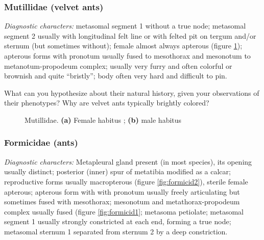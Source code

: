 \subsubsection{Mutillidae (velvet ants)}
\noindent{}\textit{Diagnostic characters:} metasomal segment 1 without a true node; metasomal segment 2 usually with longitudinal felt line or with felted pit on tergum and/or sternum (but sometimes without); female almost always apterous (figure \ref{fig:mutillid1}); apterous forms with pronotum usually fused to mesothorax and mesonotum to metanotum-propodeum complex; usually very furry and often colorful or brownish and quite ``bristly''; body often very hard and difficult to pin.\vspace{3mm}

\begin{theo}
{}What can you hypothesize about their natural history, given your observations of their phenotypes? Why are velvet ants typically brightly colored?
\end{theo}

\begin{figure}[ht!]
    \centering
    \begin{subfigure}[ht!]{0.45\textwidth}
        \caption{}
        \label{fig:mutillid1}
    \end{subfigure}
    \qquad
    \begin{subfigure}[ht!]{0.42\textwidth}
        \caption{}
        \label{fig:mutillid2}
    \end{subfigure}
    \caption{Mutillidae. \textbf{(a)} Female habitus \citep[][Fig. 63]{goulet1993hymenoptera}; \textbf{(b)} male habitus \citep[][Fig. 64]{goulet1993hymenoptera}}\label{fig:mutillids}
\end{figure}

\subsubsection{Formicidae (ants)}
\noindent{}\textit{Diagnostic characters:} Metapleural gland present (in most species), its opening usually distinct; posterior (inner) spur of metatibia modified as a calcar; reproductive forms usually macropterous (figure \ref{fig:formicid2}), sterile female apterous; apterous form with with pronotum usually freely articulating but sometimes fused with mesothorax; mesonotum and metathorax-propodeum complex usually fused (figure \ref{fig:formicid1}; metasoma petiolate; metasomal segment 1 usually strongly constricted at each end, forming a true node; metasomal sternum 1 separated from sternum 2 by a deep constriction.\vspace{3mm}

